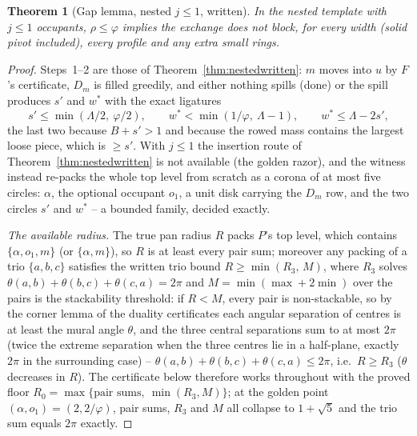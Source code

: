 \documentclass[11pt]{article}
\newtheorem{theorem}{Theorem}
\theoremstyle{definition}
\begin{document}
\begin{theorem}[Gap lemma, nested $j\le1$, written]\label{thm:gapwritten}
In the nested template with $j\le1$ occupants, $\rho\le\varphi$
implies the exchange does not block, for every width (solid pivot
included), every profile and any extra small rings.
\end{theorem}
\begin{proof}
Steps~1--2 are those of Theorem~\ref{thm:nestedwritten}: $m$ moves
into $u$ by $F$'s certificate, $D_m$ is filled greedily, and either
nothing spills (done) or the spill produces $s'$ and $w^{*}$ with
the exact ligatures
\[
s'\le\min(\Lambda/2,\ \varphi/2),
\qquad
w^{*}<\min(1/\varphi,\ \Lambda-1),
\qquad w^{*}\le\Lambda-2s',
\]
the last two because $B+s'>1$ and because the rowed mass contains
the largest loose piece, which is $\ge s'$. With $j\le1$ the
insertion route of Theorem~\ref{thm:nestedwritten} is not available
(the golden razor), and the witness instead re-packs the whole top
level from scratch as a corona of at most five circles:
$\alpha$, the optional occupant $o_1$, a unit disk carrying the
$D_m$ row, and the two circles $s'$ and $w^{*}$ -- a bounded
family, decided exactly.

\emph{The available radius.} The true pan radius $R$ packs $P$'s
top level, which contains $\{\alpha,o_1,m\}$ (or $\{\alpha,m\}$),
so $R$ is at least every pair sum; moreover any packing of a trio
$\{a,b,c\}$ satisfies the written trio bound
$R\ge\min(R_3,\,M)$, where $R_3$ solves
$\theta(a,b)+\theta(b,c)+\theta(c,a)=2\pi$ and
$M=\min(\max+2\min)$ over the pairs is the stackability threshold:
if $R<M$, every pair is non-stackable, so by the corner lemma of
the duality certificates each angular separation of centres is at
least the mural angle $\theta$, and the three central separations sum to at most $2\pi$ (twice
the extreme separation when the three centres lie in a half-plane,
exactly $2\pi$ in the surrounding case) -- $\theta(a,b)+\theta(b,c)+\theta(c,a)\le2\pi$, i.e.\
$R\ge R_3$ ($\theta$ decreases in $R$). The certificate below therefore works
throughout with the proved floor
$R_0=\max\{\text{pair sums},\ \min(R_3,M)\}$; at the golden point
$(\alpha,o_1)=(2,2/\varphi)$, pair sums, $R_3$ and $M$ all
collapse to $1+\sqrt5$ and the trio sum equals $2\pi$ exactly.


\end{proof}
\end{document}
